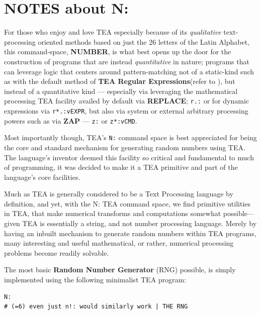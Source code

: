 \documentclass[a4paper, 18pt]{book} %
\begin{document}
\section{NOTES about N:}
\label{SECNOTEN}


For those who enjoy and love TEA especially because of its \textit{qualitative} text-processing oriented methods based on just the 26 letters of the Latin Alphabet, this command-space, \textbf{NUMBER}, is what best opens up the door for the construction of programs that are instead \textit{quantitative} in nature; programs that can leverage logic that centers around pattern-matching not of a static-kind such as with the default method of \textbf{TEA Regular Expressions}(refer to ), but instead of a quantitative kind --- especially via leveraging the mathematical processing TEA facility availed by default via \textbf{REPLACE}; \texttt{r.:} or for dynamic expressions via \texttt{r*.:vEXPR}, but also via system or external arbitrary processing powers such as via \textbf{ZAP} --- \texttt{z:} or \texttt{z*:vCMD}.

\vspace{2em}

Most importantly though, TEA's \texttt{N:} command space is best appreciated for being the core and standard mechanism for generating random numbers using TEA. The language's inventor deemed this facility so critical and fundamental to much of programming, it was decided to make it a TEA primitive and part of the language's core facilities.


\vspace{2em}


Much as TEA is generally considered to be a Text Processing language by definition, and yet, with the N: TEA command space, we find primitive utilities in TEA, that make numerical transforms and computations somewhat possible---given TEA is essentially a string, and not number processing language. Merely by having an inbuilt mechanism to generate random numbers within TEA programs, many interesting and useful mathematical, or rather, numerical processing problems become readily solvable.

The most basic \textbf{Random Number Generator} (RNG) possible, is simply implemented using the following minimalist TEA program:

\vspace{2em}



  \begin{tcolorbox}[teaterminalstyle, title=N: EXAMPLE 1: BASIC TEA RNG, breakable]
  \begin{lstlisting}[language=TEA,breaklines=true,]
N:
# (=6) even just n!: would similarly work | THE RNG
   \end{lstlisting}
  \end{tcolorbox}
\end{document}
